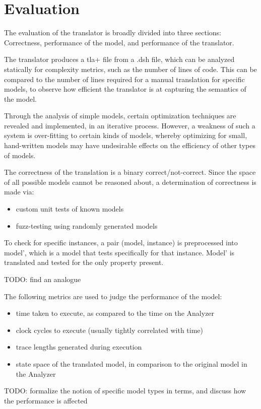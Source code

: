 \chapter{Evaluation}

The evaluation of the translator is broadly divided into three sections: Correctness, performance of the model, and performance of the translator.

The translator produces a tla+ file from a .dsh file, which can be analyzed statically for complexity metrics, such as the number of lines of code. This can be compared to the number of lines required for a manual translation for specific models, to observe how efficient the translator is at capturing the semantics of the model.

Through the analysis of simple models, certain optimization techniques are revealed and implemented, in an iterative process. However, a weakness of such a system is over-fitting to certain kinds of models, whereby optimizing for small, hand-written models may have undesirable effects on the efficiency of other types of models.

The correctness of the translation is a binary correct/not-correct. Since the space of all possible models cannot be reasoned about, a determination of correctness is made via:

\begin{itemize}
\item custom unit tests of known models
\item fuzz-testing using randomly generated models
\end{itemize}

To check for specific instances, a pair (model, instance) is preprocessed into model', which is a model that tests specifically for that instance. Model' is translated and tested for the only property present.

TODO: find an analogue

The following metrics are used to judge the performance of the model:

\begin{itemize}
	\item time taken to execute, as compared to the time on the Analyzer
	\item clock cycles to execute (usually tightly correlated with time)
	\item trace lengths generated during execution
	\item state space of the translated model, in comparison to the original model in the Analyzer
\end{itemize}


TODO: formalize the notion of specific model types in terms, and discuss how the performance is affected